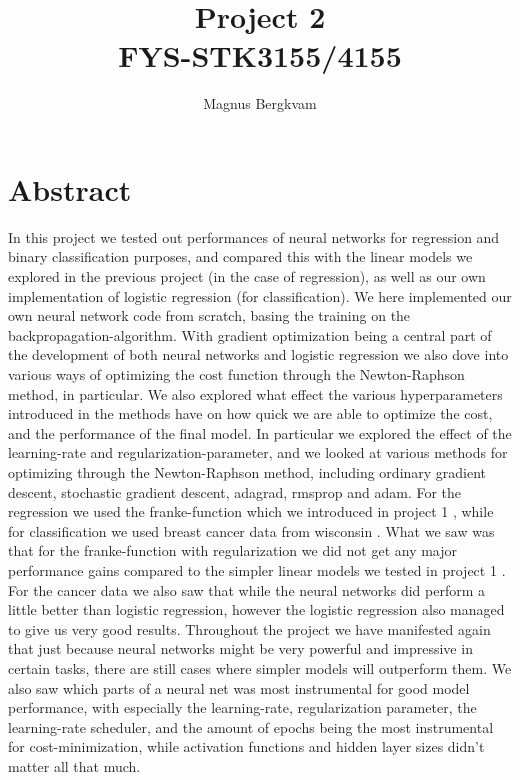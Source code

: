 \documentclass{article}
\title{Project 2 \\ FYS-STK3155/4155}
\author{Magnus Bergkvam}
\begin{document}
\maketitle


\section{Abstract}
In this project we tested out performances of neural networks for regression and
binary classification purposes, and compared this with the linear models we
explored in the previous project \cite{githubrepoproject1} (in the case of
regression), as well as our own implementation of logistic regression (for
classification). We here implemented our own neural network code from scratch,
basing the training on the backpropagation-algorithm.  With gradient
optimization being a central part of the development of both neural networks and
logistic regression we also dove into various ways of optimizing the cost
function through the Newton-Raphson method, in particular. We also explored what
effect the various hyperparameters introduced in the methods have on how quick we
are able to optimize the cost, and the performance of the final model. In
particular we explored the effect of the learning-rate and
regularization-parameter, and we looked at various methods for optimizing
through the Newton-Raphson method, including ordinary gradient descent,
stochastic gradient descent, adagrad, rmsprop and adam. For the regression we
used the franke-function which we introduced in project 1
\cite{githubrepoproject1}, while for classification we used breast cancer data
from wisconsin \cite{sklearncancerdata} \cite{breastcancerwisconsin}. What we
saw was that for the franke-function with regularization we did not get any
major performance gains compared to the simpler linear models we tested in
project 1 \cite{githubrepoproject1}. For the cancer data we also saw that while
the neural networks did perform a little better than logistic regression,
however the logistic regression also managed to give us very good results.
Throughout the project we have manifested again that just because neural
networks might be very powerful and impressive in certain tasks, there are still
cases where simpler models will outperform them. We also saw which parts of a
neural net was most instrumental for good model performance, with especially the
learning-rate, regularization parameter, the learning-rate scheduler, and the
amount of epochs being the most instrumental for cost-minimization, while
activation functions and hidden layer sizes didn't matter all that much.
\end{document}
